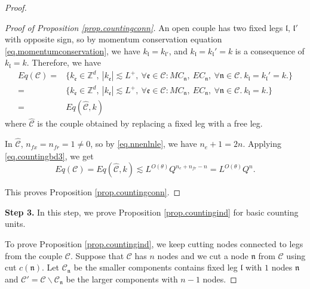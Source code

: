 \begin{proof}
\begin{proof}[Proof of Proposition \ref{prop.countingconn}]
    An open couple has two fixed legs $\mathfrak{l}$, $\mathfrak{l}'$ with opposite sign, so by momentum conservation equation \eqref{eq.momentumconservation}, we have $k_{\mathfrak{l}}=k_{\mathfrak{l}'}$, and $k_{\mathfrak{l}}=k_{\mathfrak{l}}'=k$ is a consequence of $k_{\mathfrak{l}}=k$. Therefore, we have 
    \begin{equation}\label{eq.stephatC}
    \begin{split}
     Eq(\mathcal{C})=&\{k_{\mathfrak{e}}\in \mathbb{Z}^d,\ |k_{\mathfrak{e}}| \lesssim L^+,\ \forall \mathfrak{e}\in \mathcal{C}:MC_{\mathfrak{n}},\  EC_{\mathfrak{n}},\ \forall \mathfrak{n}\in \mathcal{C}.\ k_{\mathfrak{l}}=k_{\mathfrak{l}}'=k.\} 
     \\
     =& \{k_{\mathfrak{e}}\in \mathbb{Z}^d,\ |k_{\mathfrak{e}}| \lesssim L^+,\ \forall \mathfrak{e}\in \mathcal{C}:MC_{\mathfrak{n}},\  EC_{\mathfrak{n}},\ \forall \mathfrak{n}\in \mathcal{C}.\ k_{\mathfrak{l}}=k.\} 
     \\
     =&Eq(\widehat{\mathcal{C}},k)
    \end{split}
    \end{equation}
    where $\widehat{\mathcal{C}}$ is the couple obtained by replacing a fixed leg with a free leg.
    
    In $\widehat{\mathcal{C}}$, $n_{\textit{fx}}=n_{\textit{fr}}=1\ne 0$, so by \eqref{eq.nnenlnle}, we have $n_e+1=2n$. Applying \eqref{eq.countingbd3}, we get
    \begin{equation}\label{eq.stephatC'}
     Eq(\mathcal{C})=Eq(\widehat{\mathcal{C}},k)\lesssim L^{O(\theta)} Q^{n_e+n_{\textit{fr}}-n} = L^{O(\theta)} Q^{n}.
    \end{equation}
    
    This proves Proposition \ref{prop.countingconn}.
    \end{proof}
    
    
    \textbf{Step 3.} In this step, we prove Proposition \ref{prop.countingind} for basic counting units.
    
    To prove Proposition \ref{prop.countingind}, we keep cutting nodes connected to legs from the couple $\mathcal{C}$. Suppose that $\mathcal{C}$ has $n$ nodes and we cut a node $\mathfrak{n}$ from $\mathcal{C}$ using cut $c(\mathfrak{n})$. Let $\mathcal{C}_{\mathfrak{n}}$ be the smaller components contains fixed leg $\mathfrak{l}$ with $1$ nodes $\mathfrak{n}$ and $\mathcal{C}' = \mathcal{C}\backslash \mathcal{C}_{\mathfrak{n}}$ be the larger components with $n-1$ nodes.
    

\end{proof}
